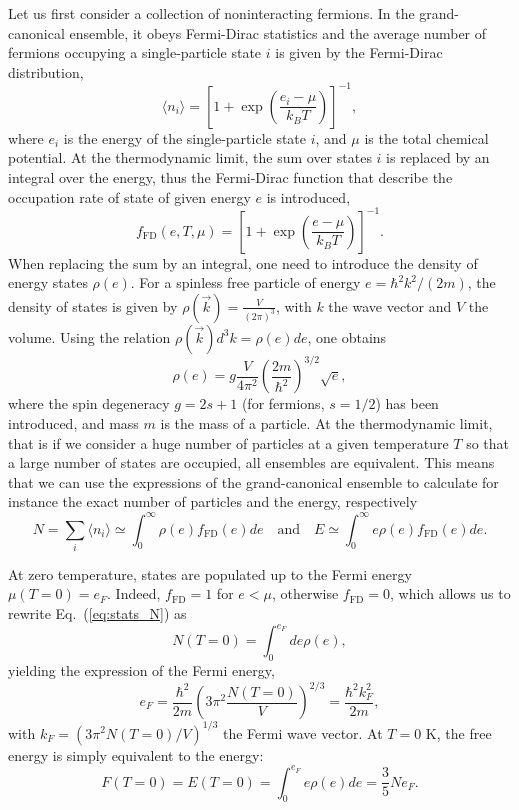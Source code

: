 Let us first consider a collection of noninteracting fermions. In the 
grand-canonical ensemble, it obeys Fermi-Dirac statistics and the average 
number of fermions occupying a single-particle state $i$ is given by the 
Fermi-Dirac distribution, 
%
\begin{equation}
  \langle n_i \rangle 
  = \left[1+\exp\left(\frac{e_i-\mu}{k_B T}\right)\right]^{-1},
\end{equation}
%
where $e_i$ is the energy of the single-particle state $i$, and $\mu$ is the
total chemical potential.
At the thermodynamic limit, the sum over states $i$ is replaced by an integral
over the energy, thus the Fermi-Dirac function that describe the
occupation rate of state of given energy $e$ is introduced,
%
\begin{equation}
  f_{\text{FD}}(e, T, \mu) 
  = \left[1+\exp\left(\frac{e-\mu}{k_B T}\right)\right]^{-1}.\label{eq:fFD}
\end{equation}
%
When replacing the sum by an integral, one need to introduce the density of
energy states $\rho(e)$. For a spinless free particle of energy $e=\hbar^2 
k^2/(2m)$, the density of states is given by $\rho(\vec{k}) =
\frac{V}{(2\pi)^3}$, with $k$ the wave vector and $V$ the volume. Using the 
relation $\rho(\vec{k})d^3k = \rho(e)de$, one obtains
%
\begin{equation}
  \rho(e) = g\frac{V}{4\pi^2}\left(\frac{2m}{\hbar^2}\right)^{3/2}\sqrt{e},
\end{equation}
%
where the spin degeneracy $g=2s+1$ (for fermions, $s=1/2$) has been introduced, 
and mass $m$ is the mass of a particle.
At the thermodynamic limit, that is if we consider a huge number of particles
at a given temperature $T$ so that a large number of states are occupied, all
ensembles are equivalent. This means that we can use the expressions of 
the grand-canonical ensemble to calculate for instance the exact number of 
particles and the energy, respectively
%
\begin{equation}
  N = \sum_i\langle n_i\rangle \simeq \int_0^\infty
  \rho(e)f_{\text{FD}}(e)de
  \quad \text{and} \quad 
  E \simeq \int_0^\infty e \rho(e) f_{\text{FD}}(e)de.\label{eq:stats_N}
\end{equation}
%

At zero temperature, states are populated up to the Fermi energy $\mu(T=0) =
e_F$. Indeed, $f_{\text{FD}} = 1$ for $e < \mu$, otherwise $f_{\text{FD}} = 0$, 
which allows us to rewrite Eq.~(\ref{eq:stats_N}) as
%
\begin{equation}
  N(T=0) = \int_0^{e_F} de\rho(e),
\end{equation}
%
yielding the expression of the Fermi energy,
%
\begin{equation}
  e_F = \frac{\hbar^2}{2m}\left(3\pi^2\frac{N(T=0)}{V}\right)^{2/3} =
  \frac{\hbar^2 k_F^2}{2m},
\end{equation}
%
with $k_F=(3\pi^2N(T=0)/V)^{1/3}$ the Fermi wave vector.
At $T=0$ K, the free energy is simply equivalent to the energy:
%
\begin{equation}
  F(T=0) = E(T=0) = \int_0^{e_F} e\rho(e)de = \frac{3}{5}Ne_F.
\end{equation}
%

